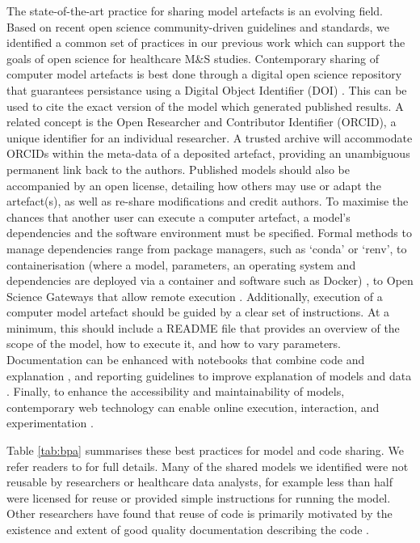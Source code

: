 \documentclass[]{interact}
\theoremstyle{plain}%
\theoremstyle{definition}
\theoremstyle{remark}
\begin{document}
The state-of-the-art practice for sharing model artefacts is an evolving field. Based on recent open science community-driven guidelines and standards, we identified a common set of practices in our previous work which can support the goals of open science for healthcare M\&S studies. Contemporary sharing of computer model artefacts is best done through a digital open science repository that guarantees persistance using a Digital Object Identifier (DOI) \citep{lin_trust_2020}. This can be used to cite the exact version of the model which generated published results. A related concept is the Open Researcher and Contributor Identifier (ORCID), a unique identifier for an individual researcher. A trusted archive will accommodate ORCIDs within the meta-data of a deposited artefact, providing an unambiguous permanent link back to the authors. Published models should also be accompanied by an open license, detailing how others may use or adapt the artefact(s), as well as re-share modifications and credit authors. To maximise the chances that another user can execute a computer artefact, a model's dependencies and the software environment must be specified. Formal methods to manage dependencies range from package managers, such as `conda' or `renv', to containerisation (where a model, parameters, an operating system and dependencies are deployed via a container and software such as Docker) \citep{moreau2023containers}, to Open Science Gateways that allow remote execution \citep{taylor2017open}. Additionally, execution of a computer model artefact should be guided by a clear set of instructions. At a minimum, this should include a README file that provides an overview of the scope of the model, how to execute it, and how to vary parameters. Documentation can be enhanced with notebooks that combine code and explanation \citep{TRACE_2021, the_turing_way_community_2022_7470333}, and reporting guidelines to improve explanation of models and data \citep{monks2019strengthening}. Finally, to enhance the accessibility and maintainability of models, contemporary web technology can enable online execution, interaction, and experimentation \citep{dagkakis2016review, monks2023improving, harper_monks_manzi_2023}.

Table \ref{tab:bpa} summarises these best practices for model and code sharing. We refer readers to \cite{monks2023computer} for full details. Many of the shared models we identified were not reusable by researchers or healthcare data analysts, for example less than half were licensed for reuse or provided simple instructions for running the model. Other researchers have found that reuse of code is primarily motivated by the existence and extent of good quality documentation describing the code \citep{rrepo24866}. 
\end{document}
